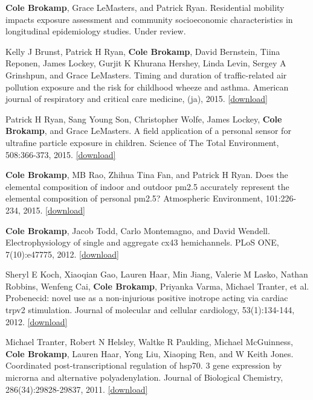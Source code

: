 \documentclass[]{article}
\date{}
\begin{document}
\textbf{Cole Brokamp}, Grace LeMasters, and Patrick Ryan. Residential
mobility impacts exposure assessment and community socioeconomic
characteristics in longitudinal epidemiology studies. Under review.

Kelly J Brunst, Patrick H Ryan, \textbf{Cole Brokamp}, David Bernstein,
Tiina Reponen, James Lockey, Gurjit K Khurana Hershey, Linda Levin,
Sergey A Grinshpun, and Grace LeMasters. Timing and duration of
traffic-related air pollution exposure and the risk for childhood wheeze
and asthma. American journal of respiratory and critical care medicine,
(ja), 2015.
\href{https://github.com/cole-brokamp/cole-brokamp.github.io/raw/master/publications/rccm\%252E201407-1314oc.pdf}{{[}download{]}}

Patrick H Ryan, Sang Young Son, Christopher Wolfe, James Lockey,
\textbf{Cole Brokamp}, and Grace LeMasters. A field application of a
personal sensor for ultrafine particle exposure in children. Science of
The Total Environment, 508:366-373, 2015.
\href{https://github.com/cole-brokamp/cole-brokamp.github.io/raw/master/publications/1-s2.0-S0048969714016556-main.pdf}{{[}download{]}}

\textbf{Cole Brokamp}, MB Rao, Zhihua Tina Fan, and Patrick H Ryan. Does
the elemental composition of indoor and outdoor pm2.5 accurately
represent the elemental composition of personal pm2.5? Atmospheric
Environment, 101:226-234, 2015.
\href{https://github.com/cole-brokamp/cole-brokamp.github.io/raw/master/publications/1-s2.0-S1352231014008814-main.pdf}{{[}download{]}}

\textbf{Cole Brokamp}, Jacob Todd, Carlo Montemagno, and David Wendell.
Electrophysiology of single and aggregate cx43 hemichannels. PLoS ONE,
7(10):e47775, 2012.
\href{https://github.com/cole-brokamp/cole-brokamp.github.io/raw/master/publications/journal.pone.0047775.pdf}{{[}download{]}}

Sheryl E Koch, Xiaoqian Gao, Lauren Haar, Min Jiang, Valerie M Lasko,
Nathan Robbins, Wenfeng Cai, \textbf{Cole Brokamp}, Priyanka Varma,
Michael Tranter, et al. Probenecid: novel use as a non-injurious
positive inotrope acting via cardiac trpv2 stimulation. Journal of
molecular and cellular cardiology, 53(1):134-144, 2012.
\href{https://github.com/cole-brokamp/cole-brokamp.github.io/raw/master/publications/nihms-373871.pdf}{{[}download{]}}

Michael Tranter, Robert N Helsley, Waltke R Paulding, Michael
McGuinness, \textbf{Cole Brokamp}, Lauren Haar, Yong Liu, Xiaoping Ren,
and W Keith Jones. Coordinated post-transcriptional regulation of hsp70.
3 gene expression by microrna and alternative polyadenylation. Journal
of Biological Chemistry, 286(34):29828-29837, 2011.
\href{https://github.com/cole-brokamp/cole-brokamp.github.io/raw/master/publications/J.\%20Biol.\%20Chem.-2011-Tranter-29828-37.pdf}{{[}download{]}}
\end{document}

